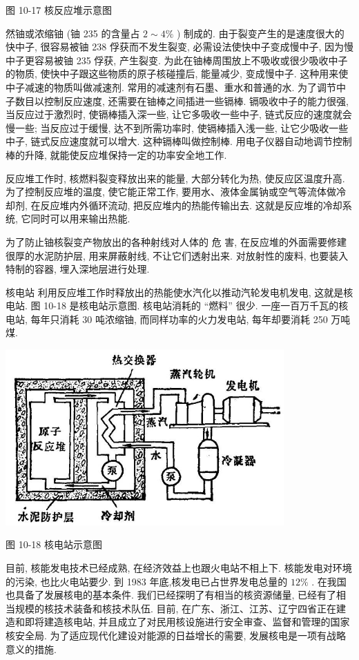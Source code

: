 \documentclass[10pt]{article}
\begin{document}
图 10-17 核反应堆示意图

然铀或浓缩铀 (铀 235 的含量占 \(2 \sim 4\%\) ) 制成的. 由于裂变产生的是速度很大的快中子, 很容易被铀 238 俘获而不发生裂变, 必需设法使快中子变成慢中子, 因为慢中子更容易被铀 235 俘获, 产生裂变. 为此在铀棒周围放上不吸收或很少吸收中子的物质, 使快中子跟这些物质的原子核碰撞后, 能量减少, 变成慢中子. 这种用来使中子减速的物质叫做减速剂. 常用的减速剂有石墨、重水和普通的水. 为了调节中子数目以控制反应速度, 还需要在铀棒之间插进一些镉棒. 镉吸收中子的能力很强, 当反应过于激烈时, 使镉棒插入深一些, 让它多吸收一些中子, 链式反应的速度就会慢一些; 当反应过于缓慢, 达不到所需功率时, 使镉棒插入浅一些, 让它少吸收一些中子, 链式反应速度就可以增大. 这种镉棒叫做控制棒. 用电子仪器自动地调节控制棒的升降, 就能使反应堆保持一定的功率安全地工作.

反应堆工作时, 核燃料裂变释放出来的能量, 大部分转化为热, 使反应区温度升高. 为了控制反应堆的温度, 使它能正常工作, 要用水、液体金属钠或空气等流体做冷却剂, 在反应堆内外循环流动, 把反应堆内的热能传输出去. 这就是反应堆的冷却系统, 它同时可以用来输出热能.

为了防止铀核裂变产物放出的各种射线对人体的 危 害, 在反应堆的外面需要修建很厚的水泥防护层, 用来屏蔽射线, 不让它们透射出来. 对放射性的废料, 也要装入特制的容器, 埋入深地层进行处理.

核电站 利用反应堆工作时释放出的热能使水汽化以推动汽轮发电机发电, 这就是核电站. 图 10-18 是核电站示意图. 核电站消耗的 “燃料” 很少. 一座一百万千瓦的核电站, 每年只消耗 30 吨浓缩铀, 而同样功率的火力发电站, 每年却要消耗 250 万吨煤.

\begin{center}
\includegraphics[max width=0.8\textwidth]{images/01913056-1f15-74d8-9184-9aab52c9d66b_362_962509.jpg}
\end{center}

图 10-18 核电站示意图

目前, 核能发电技术已经成熟, 在经济效益上也跟火电站不相上下. 核能发电对环境的污染, 也比火电站要少. 到 1983 年底,核发电已占世界发电总量的 \({12}\%\) . 在我国也具备了发展核电的基本条件. 我们已经探明了有相当的核资源储量, 已经有了相当规模的核技术装备和核技术队伍. 目前, 在广东、浙江、江苏、辽宁四省正在建造和即将建造核电站, 并且成立了对民用核设施进行安全审查、监督和管理的国家核安全局. 为了适应现代化建设对能源的日益增长的需要, 发展核电是一项有战略意义的措施.
\end{document}

